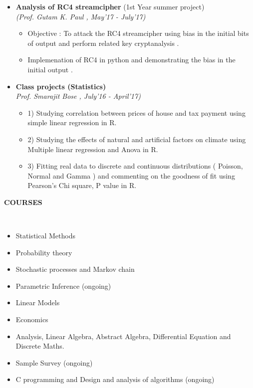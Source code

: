 \documentclass[a4paper,10pt]{article}
\newcommand{\isep}{-2 pt}
\newcommand{\lsep}{-0.5cm}
\newcommand{\resheading}[1]{{\small \colorbox{mygrey}{\begin{minipage}{0.975\textwidth}{\textbf{#1 \vphantom{p\^{E}}}}\end{minipage}}}}
\begin{document}
\begin{itemize}
\item \textbf{Analysis of RC4 streamcipher }
(1st Year summer project) \\
 \emph{(Prof. Gutam K. Paul
, May'17 - July'17)} \\[-0.6cm]
	\begin{itemize}\itemsep \isep
	\item Objective : To attack the RC4 streamcipher using bias in the initial bits of output and perform related key cryptanalysis .
	\item Implemenation of RC4 in python and demonstrating the bias in the initial output . 
	\end{itemize}
	
\item \textbf{Class projects (Statistics) }
 \\
 \emph{Prof. Smarajit Bose
, July'16 - April'17)} \\[-0.6cm]
	\begin{itemize}\itemsep \isep
	\item 1) Studying correlation between prices of house and tax payment using simple linear regression in R.
	\item 2) Studying the effects of natural and artificial factors on climate using Multiple linear regression and Anova in R. 
	\item 3) Fitting real data to discrete and continuous distributions ( Poisson, Normal and Gamma ) and commenting on the goodness of fit using Pearson's Chi square, P value in R.
	\end{itemize}
\end{itemize}

\resheading{\textbf{COURSES} }\\[\lsep]
\begin{itemize}
\item Statistical Methods
\item Probability theory
\item Stochastic processes and Markov chain
\item Parametric Inference (ongoing)
\item Linear Models
\item Economics
\item Analysis, Linear Algebra, Abstract Algebra, Differential Equation and Discrete Maths.
\item Sample Survey (ongoing)
\item C programming and Design and analysis of algorithms (ongoing)
\end{itemize}
\end{document}
